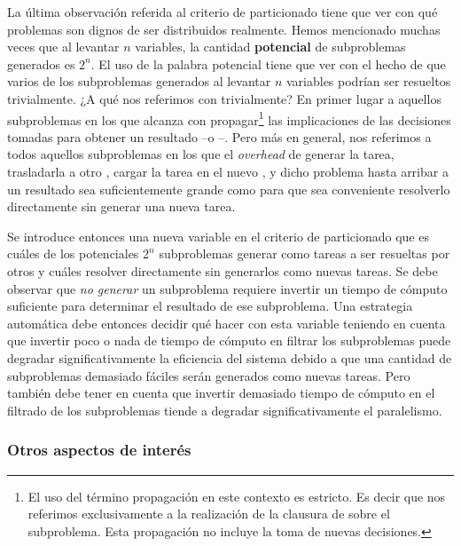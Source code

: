 La última observación referida al criterio de particionado tiene que ver con
qué problemas son dignos de ser distribuidos realmente. Hemos mencionado
muchas veces que al levantar $n$ variables, la cantidad \textbf{potencial} de
subproblemas generados es $2^n$. El uso de la palabra potencial tiene que ver
con el hecho de que varios de los subproblemas generados al levantar $n$
variables podrían ser resueltos trivialmente. ¿A qué nos referimos con
trivialmente? En primer lugar a aquellos subproblemas en los que alcanza con
propagar\footnote{El uso del término propagación en este contexto es estricto.
Es decir que nos referimos exclusivamente a la realización de la clausura de
\bcp sobre el subproblema. Esta propagación no incluye la toma de nuevas
decisiones.} las implicaciones de las decisiones tomadas para obtener un
resultado --\sat o \unsat--. Pero más en general, nos referimos a todos
aquellos subproblemas en los que el \emph{overhead} de generar la tarea,
trasladarla a otro \w, cargar la tarea en el nuevo \w, y \solvear dicho
problema hasta arribar a un resultado sea suficientemente grande como para que
sea conveniente resolverlo directamente sin generar
una nueva tarea.

Se introduce entonces una nueva variable en el criterio de particionado que es
cuáles de los potenciales $2^n$ subproblemas generar como tareas a ser
resueltas por otros \ws y cuáles resolver directamente sin generarlos como nuevas
tareas. Se debe observar que \emph{no generar} un subproblema requiere invertir
un tiempo de cómputo suficiente para determinar el resultado de ese
subproblema. Una estrategia automática debe entonces decidir qué hacer con
esta variable teniendo en cuenta que invertir poco o nada de tiempo de cómputo
en filtrar los subproblemas puede degradar significativamente la eficiencia
del sistema debido a que una cantidad de subproblemas
demasiado fáciles serán generados como nuevas tareas. Pero también debe tener en cuenta que invertir demasiado
tiempo de cómputo en el filtrado de los subproblemas tiende a degradar
significativamente el paralelismo.

\subsubsection{Otros aspectos de interés}

